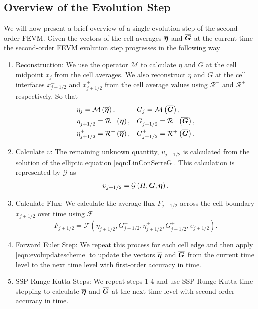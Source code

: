 \subsection{Overview of the Evolution Step}
We will now present a brief overview of a single evolution step of the second-order FEVM. Given the vectors of the cell averages $\overline{\boldsymbol{\eta}}$ and $\overline{\boldsymbol{G}}$ at the current time the second-order FEVM evolution step progresses in the following way
\begin{enumerate}
	\item Reconstruction: We use the operator $\mathcal{M}$ to calculate $\eta$ and $G$ at the cell midpoint $x_{j}$ from the cell averages. We also reconstruct $\eta$ and $G$ at the cell interfaces $x^-_{j+1/2}$ and $x^+_{j+1/2}$ from the cell average values using $\mathcal{R}^{-}$ and $\mathcal{R}^{+}$ respectively. So that
	\begin{align*}	&\eta_j = \mathcal{M}\left(\overline{\boldsymbol{\eta}}\right),&& G_j = \mathcal{M}\left(\overline{\boldsymbol{G}}\right),\\
	&\eta^-_{j+1/2} = \mathcal{R}^{-}\left(\overline{\boldsymbol{\eta}}\right),  &&G^-_{j+1/2} = \mathcal{R}^{-}\left(\overline{\boldsymbol{G}}\right), \\
	&\eta^+_{j+1/2} = \mathcal{R}^{+}\left(\overline{\boldsymbol{\eta}}\right),  &&G^+_{j+1/2} = \mathcal{R}^{+}\left(\overline{\boldsymbol{G}}\right). \\	
	\end{align*}
	\item Calculate $\upsilon$: The remaining unknown quantity, $\upsilon_{j+1/2}$ is calculated from the solution of the elliptic equation \eqref{eqn:LinConSerreG}. This calculation is represented by $\mathcal{G}$ as
	\begin{equation*}
	\upsilon_{j+1/2} = \mathcal{G}\left(H, {\boldsymbol{G}},{\boldsymbol{\eta}}\right).
	\end{equation*}
	\item Calculate Flux: We calculate the average flux $F_{j+1/2}$ across the cell boundary
	 $x_{j+1/2}$ over time using $\mathcal{F}$
 	\begin{equation*}
 	F_{j+1/2} =\mathcal{F} \left(\eta^-_{j+1/2}, G^-_{j+1/2},\eta^+_{j+1/2}, G^+_{j+1/2},\upsilon_{j+1/2}  \right). 
 	\end{equation*}
	\item Forward Euler Step: We repeat this process for each cell edge and then apply \eqref{eqn:evolupdatescheme} to update the vectors $\overline{\boldsymbol{\eta}}$ and $\overline{\boldsymbol{G}}$ from the current time level to the next time level with first-order accuracy in time.
	\item SSP Runge-Kutta Steps: We repeat steps 1-4 and use SSP Runge-Kutta time stepping to calculate $\overline{\boldsymbol{\eta}}$ and $\overline{\boldsymbol{G}}$ at the next time level with second-order accuracy in time.
\end{enumerate}

